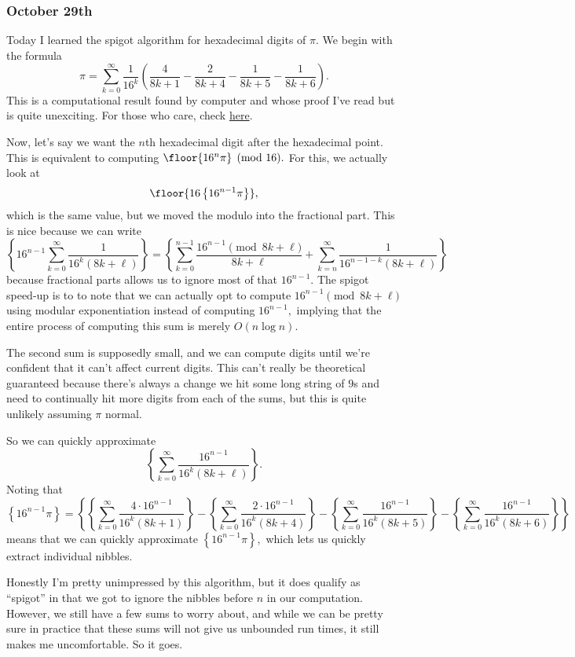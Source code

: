 \subsubsection{October 29th}
Today I learned the spigot algorithm for hexadecimal digits of $\pi.$ We begin with the formula
\[\pi=\sum_{k=0}^{\infty}\frac1{16^k}\left(\frac4{8k+1}-\frac2{8k+4}-\frac1{8k+5}-\frac1{8k+6}\right).\]
This is a computational result found by computer and whose proof I've read but is quite unexciting. For those who care, check \href{https://www.davidhbailey.com//dhbpapers/pi-quest.pdf}{here}.

Now, let's say we want the $n$th hexadecimal digit after the hexadecimal point. This is equivalent to computing $\floor{16^n\pi}\pmod{16}.$ For this, we actually look at 
\[\floor{16\left\{16^{n-1}\pi\right\}},\]
which is the same value, but we moved the modulo into the fractional part. This is nice because we can write
\[\left\{16^{n-1}\sum_{k=0}^\infty\frac1{16^k(8k+\ell)}\right\}=\left\{\sum_{k=0}^{n-1}\frac{16^{n-1}\pmod{8k+\ell}}{8k+\ell}+\sum_{k=n}^\infty\frac1{16^{n-1-k}(8k+\ell)}\right\}\]
because fractional parts allows us to ignore most of that $16^{n-1}.$ The spigot speed-up is to to note that we can actually opt to compute $16^{n-1}\pmod{8k+\ell}$ using modular exponentiation instead of computing $16^{n-1},$ implying that the entire process of computing this sum is merely $O(n\log n).$

The second sum is supposedly small, and we can compute digits until we're confident that it can't affect current digits. This can't really be theoretical guaranteed because there's always a change we hit some long string of $9$s and need to continually hit more digits from each of the sums, but this is quite unlikely assuming $\pi$ normal.

So we can quickly approximate
\[\left\{\sum_{k=0}^\infty\frac{16^{n-1}}{16^k(8k+\ell)}\right\}.\]
Noting that
\[\left\{16^{n-1}\pi\right\}=\left\{\left\{\sum_{k=0}^\infty\frac{4\cdot16^{n-1}}{16^k(8k+1)}\right\}-\left\{\sum_{k=0}^\infty\frac{2\cdot16^{n-1}}{16^k(8k+4)}\right\}-\left\{\sum_{k=0}^\infty\frac{16^{n-1}}{16^k(8k+5)}\right\}-\left\{\sum_{k=0}^\infty\frac{16^{n-1}}{16^k(8k+6)}\right\}\right\}\]
means that we can quickly approximate $\left\{16^{n-1}\pi\right\},$ which lets us quickly extract individual nibbles.

Honestly I'm pretty unimpressed by this algorithm, but it does qualify as ``spigot'' in that we got to ignore the nibbles before $n$ in our computation. However, we still have a few sums to worry about, and while we can be pretty sure in practice that these sums will not give us unbounded run times, it still makes me uncomfortable. So it goes.

